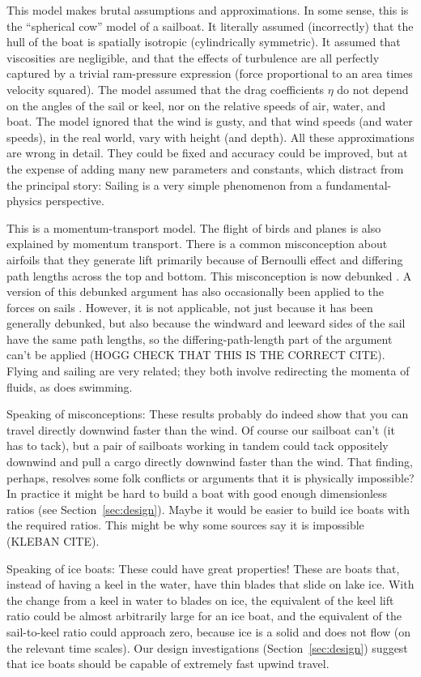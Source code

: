 \documentclass[letterpaper]{article}
\newcommand{\secref}[1]{Section~\ref{#1}}
\begin{document}
This model makes brutal assumptions and approximations.
In some sense, this is the ``spherical cow'' model of a sailboat.
It literally assumed (incorrectly) that the hull of the boat is spatially isotropic (cylindrically symmetric).
It assumed that viscosities are negligible, and that the effects of turbulence are all perfectly captured by a trivial ram-pressure expression (force proportional to an area times velocity squared).
The model assumed that the drag coefficients $\eta$ do not depend on the angles of the sail or keel, nor on the relative speeds of air, water, and boat.
The model ignored that the wind is gusty, and that wind speeds (and water speeds), in the real world, vary with height (and depth).
All these approximations are wrong in detail.
They could be fixed and accuracy could be improved, but at the expense of adding many new parameters and constants, which distract from the principal story:
Sailing is a very simple phenomenon from a fundamental-physics perspective.

This is a momentum-transport model.
The flight of birds and planes is also explained by momentum transport.
There is a common misconception about airfoils that they generate lift primarily because of Bernoulli effect and differing path lengths across the top and bottom.
This misconception is now debunked \cite{lift}.
A version of this debunked argument has also occasionally been applied to the forces on sails \cite{explained}.
However, it is not applicable, not just because it has been generally debunked, but also because the windward and leeward sides of the sail have the same path lengths, so the differing-path-length part of the argument can't be applied \cite{sails} (HOGG CHECK THAT THIS IS THE CORRECT CITE).
Flying and sailing are very related; they both involve redirecting the momenta of fluids, as does swimming.

Speaking of misconceptions: These results probably do indeed show that you can travel directly downwind faster than the wind.
Of course our sailboat can't (it has to tack), but a pair of sailboats working in tandem could tack oppositely downwind and pull a cargo directly downwind faster than the wind.
That finding, perhaps, resolves some folk conflicts or arguments that it is physically impossible?
In practice it might be hard to build a boat with good enough dimensionless ratios (see \secref{sec:design}).
Maybe it would be easier to build ice boats with the required ratios.
This might be why some sources say it is impossible (KLEBAN CITE).

Speaking of ice boats: These could have great properties!
These are boats that, instead of having a keel in the water, have thin blades that slide on lake ice.
With the change from a keel in water to blades on ice, the equivalent of the keel lift ratio could be almost arbitrarily large for an ice boat, and the equivalent of the sail-to-keel ratio could approach zero, because ice is a solid and does not flow (on the relevant time scales).
Our design investigations (\secref{sec:design}) suggest that ice boats should be capable of extremely fast upwind travel.
\end{document}
